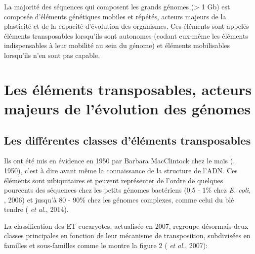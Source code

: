 \documentclass[a4paper, 12pt]{article}
\begin{document}
\begin{onehalfspace}
La majorité des séquences qui composent les grands génomes (> 1 Gb) est composée d'éléments génétiques mobiles et répétés, acteurs majeurs de la plasticité et de la capacité d'évolution des organismes. Ces éléments sont appelés éléments transposables lorsqu'ils sont autonomes (codant eux-même les éléments indispensables à leur mobilité au sein du génome) et éléments mobilisables lorsqu'ils n'en sont pas capable.

\section{Les éléments transposables, acteurs majeurs de l'évolution des génomes}
\subsection{Les différentes classes d'éléments transposables}
Ils ont été mis en évidence en 1950 par Barbara MacClintock chez le maïs (, 1950), c'est à dire avant même la connaissance de la structure de l'ADN. Ces éléments sont uibiquitaires et peuvent représenter de l'ordre de quelques pourcents des séquences chez les petits génomes bactériens (0.5 - 1\% chez \textit{E. coli}, , 2006) et jusqu'à 80 - 90\% chez les génomes complexes, comme celui du blé tendre ( \textit{et al.}, 2014). 

La classification des ET eucaryotes, actualisée en 2007, regroupe désormais deux classes principales en fonction de leur mécanisme de transposition, subdivisées en familles et sous-familles comme le montre la figure 2 ( \textit{et al.}, 2007):


\end{onehalfspace}
\end{document}
